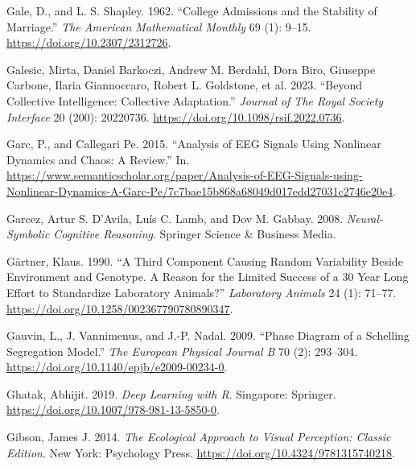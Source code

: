 \documentclass[
  letterpaper,
]{scrbook}
\newlength{\cslhangindent}
\newlength{\cslentryspacingunit} %
\newenvironment{CSLReferences}[2] %
 {%
  \setlength{\parindent}{0pt}
  \ifodd #1
  \let\oldpar\par
  \def\par{\hangindent=\cslhangindent\oldpar}
  \fi
  \setlength{\parskip}{#2\cslentryspacingunit}
 }%
 {}
\begin{document}
\begin{CSLReferences}{1}{0}
\leavevmode{}%
Gale, D., and L. S. Shapley. 1962. {``College {Admissions} and the
{Stability} of {Marriage}.''} \emph{The American Mathematical Monthly}
69 (1): 9--15. \url{https://doi.org/10.2307/2312726}.

\leavevmode{}%
Galesic, Mirta, Daniel Barkoczi, Andrew M. Berdahl, Dora Biro, Giuseppe
Carbone, Ilaria Giannoccaro, Robert L. Goldstone, et al. 2023. {``Beyond
Collective Intelligence: {Collective} Adaptation.''} \emph{Journal of
The Royal Society Interface} 20 (200): 20220736.
\url{https://doi.org/10.1098/rsif.2022.0736}.

\leavevmode{}%
Garc, P., and Callegari Pe. 2015. {``Analysis of EEG Signals Using
Nonlinear Dynamics and Chaos: A Review.''} In.
\url{https://www.semanticscholar.org/paper/Analysis-of-EEG-Signals-using-Nonlinear-Dynamics-A-Garc-Pe/7c7bae15b868a68049d017edd27031c2746e20e4}.

\leavevmode{}%
Garcez, Artur S. D'Avila, Luís C. Lamb, and Dov M. Gabbay. 2008.
\emph{Neural-{Symbolic Cognitive Reasoning}}. {Springer Science \&
Business Media}.

\leavevmode{}%
Gärtner, Klaus. 1990. {``A Third Component Causing Random Variability
Beside Environment and Genotype. {A} Reason for the Limited Success of a
30 Year Long Effort to Standardize Laboratory Animals?''}
\emph{Laboratory Animals} 24 (1): 71--77.
\url{https://doi.org/10.1258/002367790780890347}.

\leavevmode{}%
Gauvin, L., J. Vannimenus, and J.-P. Nadal. 2009. {``Phase Diagram of a
{Schelling} Segregation Model.''} \emph{The European Physical Journal B}
70 (2): 293--304. \url{https://doi.org/10.1140/epjb/e2009-00234-0}.

\leavevmode{}%
Ghatak, Abhijit. 2019. \emph{Deep {Learning} with {R}}. {Singapore}:
{Springer}. \url{https://doi.org/10.1007/978-981-13-5850-0}.

\leavevmode{}%
Gibson, James J. 2014. \emph{The {Ecological Approach} to {Visual
Perception}: {Classic Edition}}. {New York}: {Psychology Press}.
\url{https://doi.org/10.4324/9781315740218}.


\end{CSLReferences}
\end{document}

